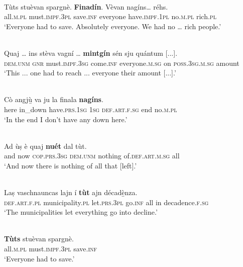 \ea

\\
\gll Tùts stuèvan spargnè. \textbf{Finadín}. Vèvan nagíns… réhs.\\
all.\textsc{m.pl} must.\textsc{impf.3pl} save.\textsc{inf} everyone have.\textsc{impf.1pl} no.\textsc{m.pl} rich.\textsc{pl}\\
\glt `Everyone had to save. Absolutely everyone. We had no … rich people.'
\z

\ea

\\
	\gll Quaj … ins stèva vagní … \textbf{mintgín} sén sju quántum [...].\\
\textsc{dem.unm} {} \textsc{gnr} must.\textsc{impf.3sg} come.\textsc{inf} {} everyone.\textsc{m.sg} on \textsc{poss.3sg.m.sg} amount\\
\glt `This ... one had to reach ... everyone their amount [...].'
\z

\ea

\\
\gll  Cò angjù̱ va ju la finala \textbf{nagíns}.  \\
here in\_down have.\textsc{prs.1sg} \textsc{1sg} \textsc{def.art.f.sg} end no.\textsc{m.pl}  \\
\glt `In the end I don’t have any down here.'
\z

\ea

\\
\gll  Ad ùṣ è quaj \textbf{nuét} dal tùt.   \\
and now \textsc{cop.prs.3sg} \textsc{dem.unm} nothing of.\textsc{def.art.m.sg} all\\
\glt `And now there is nothing of all that [left].'
\z

\ea

\\
\gll Laṣ vaschnauncas lajn í \textbf{tùt} ajn décadè̱nza.\\
\textsc{def.art.f.pl} municipality.\textsc{pl} let.\textsc{prs.3pl} go.\textsc{inf} all in decadence.\textsc{f.sg}  \\
\glt `The municipalities let everything go into decline.'
\z

\ea

\\
\gll    \textbf{Tùts} stuèvan spargnè.\\
all.\textsc{m.pl} must.\textsc{impf.3pl} save.\textsc{inf}\\
\glt `Everyone had to save.'
\z


